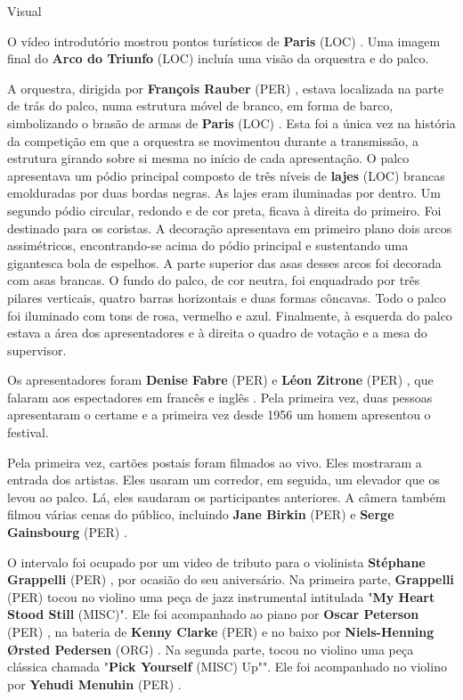 \documentclass[12pt,a4paper]{article}
\begin{document}
Visual

O vídeo introdutório mostrou pontos turísticos de \textbf{Paris} (LOC) . Uma imagem final do \textbf{Arco do Triunfo} (LOC) incluía uma visão da orquestra e do palco.

A orquestra, dirigida por \textbf{François Rauber} (PER) , estava localizada na parte de trás do palco, numa estrutura móvel de branco, em forma de barco, simbolizando o brasão de armas de \textbf{Paris} (LOC) . Esta foi a única vez na história da competição em que a orquestra se movimentou durante a transmissão, a estrutura girando sobre si mesma no início de cada apresentação. O palco apresentava um pódio principal composto de três níveis de \textbf{lajes} (LOC) brancas emolduradas por duas bordas negras. As lajes eram iluminadas por dentro. Um segundo pódio circular, redondo e de cor preta, ficava à direita do primeiro. Foi destinado para os coristas. A decoração apresentava em primeiro plano dois arcos assimétricos, encontrando-se acima do pódio principal e sustentando uma gigantesca bola de espelhos. A parte superior das asas desses arcos foi decorada com asas brancas. O fundo do palco, de cor neutra, foi enquadrado por três pilares verticais, quatro barras horizontais e duas formas côncavas. Todo o palco foi iluminado com tons de rosa, vermelho e azul. Finalmente, à esquerda do palco estava a área dos apresentadores e à direita o quadro de votação e a mesa do supervisor.

Os apresentadores foram \textbf{Denise Fabre} (PER) e \textbf{Léon Zitrone} (PER) , que falaram aos espectadores em francês e inglês . Pela primeira vez, duas pessoas apresentaram o certame e a primeira vez desde 1956 um homem apresentou o festival.

Pela primeira vez, cartões postais foram filmados ao vivo. Eles mostraram a entrada dos artistas. Eles usaram um corredor, em seguida, um elevador que os levou ao palco. Lá, eles saudaram os participantes anteriores. A câmera também filmou várias cenas do público, incluindo \textbf{Jane Birkin} (PER) e \textbf{Serge Gainsbourg} (PER) .

O intervalo foi ocupado por um video de tributo para o violinista \textbf{Stéphane Grappelli} (PER) , por ocasião do seu aniversário. Na primeira parte, \textbf{Grappelli} (PER) tocou no violino uma peça de jazz instrumental intitulada "\textbf{My Heart Stood Still} (MISC)". Ele foi acompanhado ao piano por \textbf{Oscar Peterson} (PER) , na bateria de \textbf{Kenny Clarke} (PER) e no baixo por \textbf{Niels-Henning Ørsted Pedersen} (ORG) . Na segunda parte, tocou no violino uma peça clássica chamada "\textbf{Pick Yourself} (MISC) Up"". Ele foi acompanhado no violino por \textbf{Yehudi Menuhin} (PER) .
\end{document}
